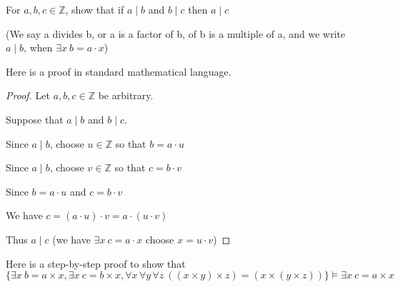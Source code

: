 \begin{exmp}
For $a,b,c \in \mathbb{Z}$, show that if $a\mid b$ and $b\mid c$ then $a\mid c$ 

(We say a divides b, or a is a factor of b, of b is a multiple of a, and we write $a\mid b$, when $\exists x \ b=a\cdot x$)
\end{exmp}

Here is a proof in standard mathematical language.

\begin{proof}
Let $a,b,c\in \mathbb{Z}$ be arbitrary.

Suppose that $a\mid b$ and $b\mid c$.

Since $a\mid b$, choose $u\in \mathbb{Z}$ so that $b=a\cdot u$

Since $a\mid b$, choose $v\in \mathbb{Z}$ so that $c=b\cdot v$

Since $b=a\cdot u$ and $c = b\cdot v$

We have $c = (a\cdot u) \cdot v = a\cdot (u\cdot v)$

Thus $a\mid c$ (we have $\exists x \ c=a\cdot x$ choose $x=u\cdot v$)

\end{proof}

Here is a step-by-step proof to show that 
\[
\{\exists x \ b = a\times x, \exists x \ c=b\times x,\forall x \, \forall y \, \forall z \ ((x\times y)\times z) = (x\times (y\times z))\} \vDash \exists x \ c=a\times x
\]

